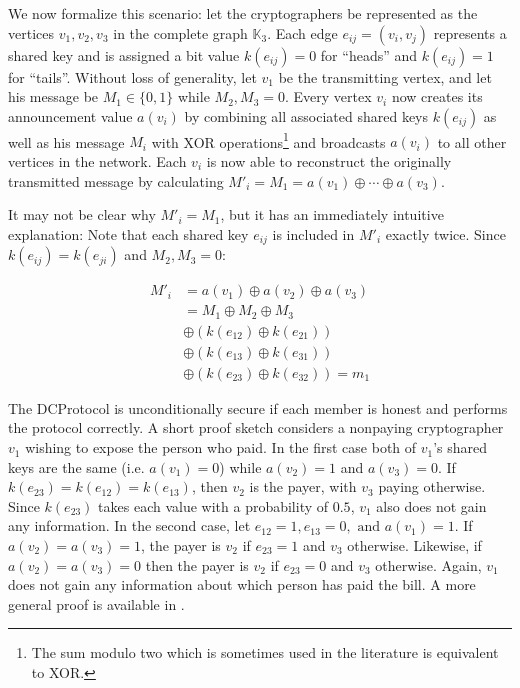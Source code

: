 We now formalize this scenario: let the cryptographers be represented as the vertices 
$v_1, v_2, v_3$ in the complete graph $\mathbb{K}_3$. Each edge $e_{ij} = (v_i, v_j)$ represents a shared
key and is assigned a bit value $k(e_{ij}) = 0$ for ``heads'' and $k(e_{ij}) = 1$ for ``tails''. Without loss of generality,
let $v_1$ be the transmitting vertex, and let his message be $M_1 \in \{0, 1\}$ while $M_2, M_3 = 0$.
Every vertex $v_i$ now creates its announcement value $a(v_i)$ by combining all associated shared keys $k(e_{ij})$
as well as his message $M_i$ with XOR operations\footnote{
The sum modulo two which is sometimes used in the literature is equivalent to XOR.}
and broadcasts $a(v_i)$ to all other vertices in the network. Each $v_i$ is now able to
reconstruct the originally transmitted message by calculating
$M'_i = M_1 = a(v_1) \oplus \cdots \oplus a(v_3)$.

It may not be clear why $M'_i = M_1$, but it has an immediately intuitive explanation:
Note that each shared key $e_{ij}$ is included in $M'_i$ exactly twice.
Since $k(e_{ij}) = k(e_{ji})$ and $M_2, M_3 = 0$:

\begin{align*}
M'_i &= a(v_1) \oplus a(v_2) \oplus a(v_3) \\
     &= M_1 \oplus M_2 \oplus M_3 \\
     & \oplus (k(e_{12}) \oplus k(e_{21})) \\
     & \oplus (k(e_{13}) \oplus k(e_{31})) \\
     & \oplus (k(e_{23}) \oplus k(e_{32})) = m_1
\end{align*}

The \ac{DCProtocol} is unconditionally secure if each member is honest and performs the
protocol correctly. A short proof sketch considers a nonpaying cryptographer $v_1$
wishing to expose the person who paid. In the first case both of $v_1$'s shared keys are the same
(i.e. $a(v_1) = 0$) while $a(v_2) = 1$ and $a(v_3) = 0$. If $k(e_23) = k(e_12) = k(e_13)$, then $v_2$
is the payer, with $v_3$ paying otherwise. Since $k(e_23)$ takes each value with a probability
of $0.5$, $v_1$ also does not gain any information. In the second case, let $e_{12} = 1, e_{13} = 0, \text{ and } a(v_1) = 1$. If $a(v_2) = a(v_3) = 1$, the payer is $v_2$ if $e_{23} = 1$ and $v_3$ otherwise.
Likewise, if $a(v_2) = a(v_3) = 0$ then the payer is $v_2$ if $e_{23} = 0$ and $v_3$ otherwise.
Again, $v_1$ does not gain any information about which person has paid the bill.
A more general proof is available in \cite{journals/joc/Chaum88}.

